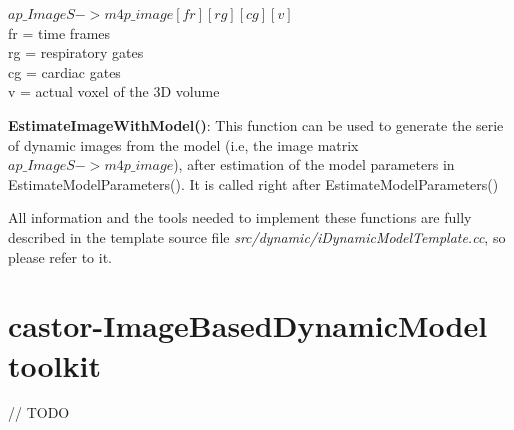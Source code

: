 \documentclass[a4paper, 11pt]{article}
\begin{document}
\begin{description}
$ap\_ImageS->m4p\_image[fr][rg][cg][v]$ \\
fr = time frames \\
rg = respiratory gates \\
cg = cardiac gates \\
 v = actual voxel of the 3D volume

\item \textbf{EstimateImageWithModel()}: This function can be used to generate the serie of dynamic images from the model (i.e, the image matrix $ap\_ImageS->m4p\_image$), after estimation of the model parameters in EstimateModelParameters(). It is called right after EstimateModelParameters()

All information and the tools needed to implement these functions are fully described in the template source file \textit{src/dynamic/iDynamicModelTemplate.cc}, so please refer to it.

\end{description}



\section{castor-ImageBasedDynamicModel toolkit}
\label{section_dmodel_toolkit}

// TODO



\clearpage
\end{document}

